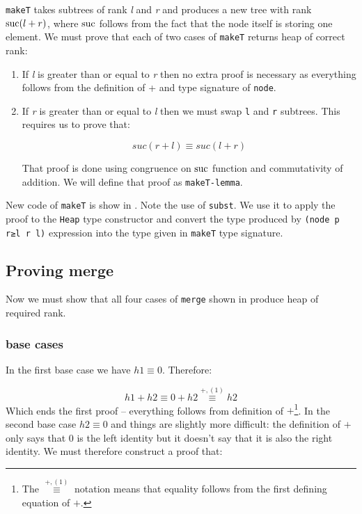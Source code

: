 \texttt{makeT} takes subtrees of rank \textit{l} and \textit{r} and produces a new tree with rank $\operatorname{suc}(l + r)$, where $\operatorname{suc}$ follows from the fact that the node itself is storing one element. We must prove that each of two cases of \texttt{makeT} returns heap of correct rank:

\begin{enumerate}
 \item If \textit{l} is greater than or equal to \textit{r} then no extra proof is necessary as everything follows from the definition of + and type signature of \texttt{node}.
 \item If \textit{r} is greater than or equal to \textit{l} then we must swap \texttt{l} and \texttt{r} subtrees. This requires us to prove that:

\begin{equation*}
suc (r + l) ≡ suc (l + r)
\end{equation*}

That proof is done using congruence on $\operatorname{suc}$ function and commutativity of addition. We will define that proof as \texttt{makeT-lemma}.
\end{enumerate}
\noindent
New code of \texttt{makeT} is show in . Note the use of \texttt{subst}. We use it to apply the proof to the \texttt{Heap} type constructor and convert the type produced by \texttt{(node p r≥l r l)} expression into the type given in \texttt{makeT} type signature.

\subsection{Proving merge}

Now we must show that all four cases of \texttt{merge} shown in  produce heap of required rank.

\subsubsection{base cases}

In the first base case we have $h1 ≡ 0$. Therefore:

\begin{equation*}
h1 + h2 ≡ 0 + h2 \stackrel{+, (1)}{≡} h2
\end{equation*}
\noindent
Which ends the first proof -- everything follows from definition of $+$\footnote{The $\stackrel{+, (1)}{≡}$ notation means that equality follows from the first defining equation of $+$.}. In the second base case $h2 ≡ 0$ and things are slightly more difficult: the definition of $+$ only says that $0$ is the left identity but it doesn't say that it is also the right identity. We must therefore construct a proof that:

